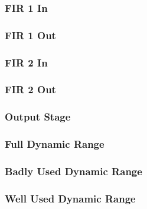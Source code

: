 \begin{frame}
    \frametitle{FIR 1 In}

    \centering
    
    
\end{frame}

\begin{frame}
    \frametitle{FIR 1 Out}

    \centering
    
    
\end{frame}

\begin{frame}
    \frametitle{FIR 2 In}

    \centering
    
    
\end{frame}

\begin{frame}
    \frametitle{FIR 2 Out}

    \centering
    
    
\end{frame}

\begin{frame}
    \frametitle{Output Stage}

    \centering
    
    
\end{frame}

\begin{frame}
    \frametitle{Full Dynamic Range}

    \centering
    
    
\end{frame}

\begin{frame}
    \frametitle{Badly Used Dynamic Range}

    \centering
    
    
\end{frame}

\begin{frame}
    \frametitle{Well Used Dynamic Range}

    \centering
    
    
\end{frame}